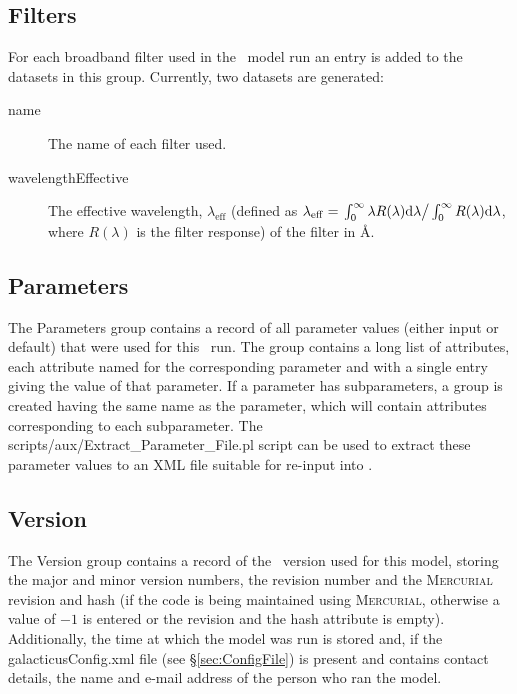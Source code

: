 \subsection{Filters}

For each broadband filter used in the \glc\ model run an entry is added to the datasets in this group. Currently, two datasets are generated:
\begin{description}
\item[{\normalfont \ttfamily name}] The name of each filter used.
\item[{\normalfont \ttfamily wavelengthEffective}] The effective wavelength, $\lambda_\mathrm{eff}$ (defined as $\lambda_\mathrm{eff}=\left. \int_0^\infty \lambda R(\lambda) \mathrm{d}\lambda \right/ \int_0^\infty R(\lambda) \mathrm{d}\lambda$, where $R(\lambda)$ is the filter response) of the filter in \AA.
\end{description}

\subsection{Parameters}

The {\normalfont \ttfamily Parameters} group contains a record of all parameter values (either input or default) that were used for this \glc\ run. The group contains a long list of attributes, each attribute named for the corresponding parameter and with a single entry giving the value of that parameter. If a parameter has subparameters, a group is created having the same name as the parameter, which will contain attributes corresponding to each subparameter. The {\normalfont \ttfamily scripts/aux/Extract\_Parameter\_File.pl} script can be used to extract these parameter values to an XML file suitable for re-input into \glc.

\subsection{Version}

The {\normalfont \ttfamily Version} group contains a record of the \glc\ version used for this model, storing the major and minor version numbers, the revision number and the {\normalfont \scshape Mercurial} revision and hash (if the code is being maintained using {\normalfont \scshape Mercurial}, otherwise a value of $-1$ is entered or the revision and the hash attribute is empty). Additionally, the time at which the model was run is stored and, if the {\normalfont \ttfamily galacticusConfig.xml} file (see \S\ref{sec:ConfigFile}) is present and contains contact details, the name and e-mail address of the person who ran the model.

